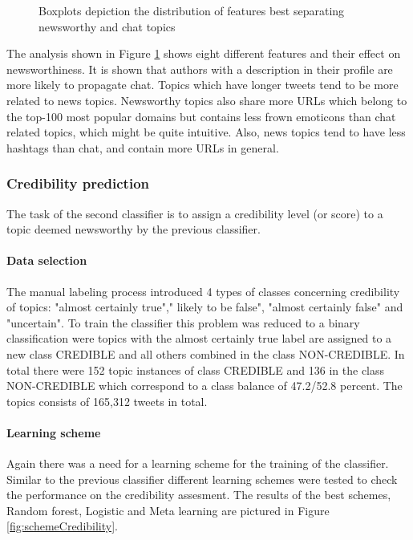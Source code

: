 \documentclass{proseminar}
\begin{document}
\begin{figure}[h]
\centering
{}
\caption{Boxplots depiction the distribution of features best separating newsworthy and chat topics}
\label{fig:boxNews}
\end{figure}

The analysis shown in Figure \ref{fig:boxNews} shows eight different features and their effect on newsworthiness. It is shown that authors with a description in their profile are more likely to propagate chat. 
Topics which have longer tweets tend to be more related to news topics. Newsworthy topics also share more URLs which belong to the top-100 most popular domains but contains less frown emoticons than chat related topics, which might be quite intuitive.
Also, news topics tend to have less hashtags than chat, and contain more URLs in general.


\subsubsection*{Credibility prediction}
The task of the second classifier is to assign a credibility level (or score) to a topic deemed newsworthy by the previous classifier.

\paragraph{Data selection}
The manual labeling process introduced 4 types of classes concerning credibility of topics:  "almost certainly true"," likely to be false",  "almost certainly false" and "uncertain". To train the classifier this problem was reduced to a binary classification were topics with the almost certainly true label are assigned to a new class CREDIBLE and all others combined in the class NON-CREDIBLE.
In total there were 152 topic instances of class CREDIBLE and 136 in the class NON-CREDIBLE which correspond to a class balance of 47.2/52.8 percent. The topics consists of  165,312 tweets in total. 


\paragraph{Learning scheme}
Again there was a need for a learning scheme for the training of the classifier. Similar to the previous classifier different learning schemes were tested to check the performance on the credibility assesment. The results of the best schemes, Random forest, Logistic and Meta learning are pictured in Figure \ref{fig:schemeCredibility}.
\end{document}
